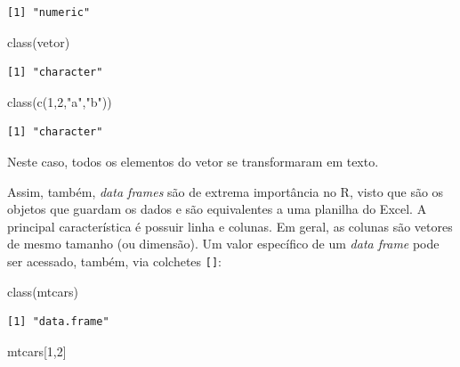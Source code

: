 \documentclass[
  12pt,
  letterpaper,
  DIV=11,
  numbers=noendperiod]{scrreprt}
\newenvironment{Shaded}{\begin{snugshade}}{\end{snugshade}}
\newcommand{\DecValTok}[1]{\textcolor[rgb]{0.68,0.00,0.00}{#1}}
\newcommand{\FunctionTok}[1]{\textcolor[rgb]{0.28,0.35,0.67}{#1}}
\newcommand{\NormalTok}[1]{\textcolor[rgb]{0.00,0.23,0.31}{#1}}
\newcommand{\StringTok}[1]{\textcolor[rgb]{0.13,0.47,0.30}{#1}}
\theoremstyle{definition}
\theoremstyle{exemplo}
\begin{document}
\begin{verbatim}
[1] "numeric"
\end{verbatim}

\begin{Shaded}
\begin{Highlighting}[]
\FunctionTok{class}\NormalTok{(vetor)}
\end{Highlighting}
\end{Shaded}

\begin{verbatim}
[1] "character"
\end{verbatim}

\begin{Shaded}
\begin{Highlighting}[]
\FunctionTok{class}\NormalTok{(}\FunctionTok{c}\NormalTok{(}\DecValTok{1}\NormalTok{,}\DecValTok{2}\NormalTok{,}\StringTok{"a"}\NormalTok{,}\StringTok{"b"}\NormalTok{))}
\end{Highlighting}
\end{Shaded}

\begin{verbatim}
[1] "character"
\end{verbatim}

\noindent Neste caso, todos os elementos do vetor se transformaram em
texto.

Assim, também, \emph{data frames} são de extrema importância no R, visto
que são os objetos que guardam os dados e são equivalentes a uma
planilha do Excel. A principal característica é possuir linha e colunas.
Em geral, as colunas são vetores de mesmo tamanho (ou dimensão). Um
valor específico de um \emph{data frame} pode ser acessado, também, via
colchetes \texttt{{[}{]}}:

\begin{Shaded}
\begin{Highlighting}[]
\FunctionTok{class}\NormalTok{(mtcars)}
\end{Highlighting}
\end{Shaded}

\begin{verbatim}
[1] "data.frame"
\end{verbatim}

\begin{Shaded}
\begin{Highlighting}[]
\NormalTok{mtcars[}\DecValTok{1}\NormalTok{,}\DecValTok{2}\NormalTok{]}
\end{Highlighting}
\end{Shaded}
\end{document}
